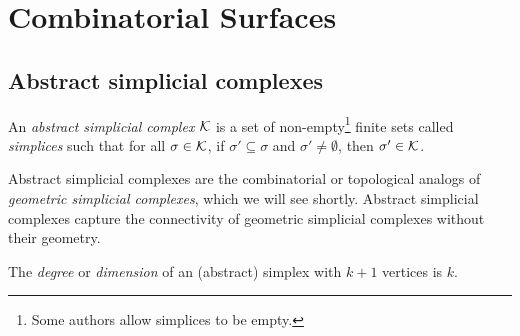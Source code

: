 \chapter{Combinatorial Surfaces}
\label{chap:combinatorial_surfaces}

\section{Abstract simplicial complexes}

\begin{definition}\label{def:abstract_simplicial_complex}
    \leanok
    An \emph{abstract simplicial complex} $\mathcal{K}$ is a set of non-empty\footnote{Some authors allow simplices to be empty.} finite sets called \emph{simplices} such that
    for all $\sigma \in \mathcal{K}$, 
    if $\sigma' \subseteq \sigma$ 
    and $\sigma' \neq \emptyset$,
    then $\sigma' \in \mathcal{K}$.
\begin{comment}
    An \emph{abstract simplicial complex} is a pair $(V,\K)$, 
    where $V$ is a set, 
    $\K \subseteq \Pow(V)$ is a set of finite %
    subsets of $V$, 
    and for all $\sigma \in \K$, 
    if $\sigma' \subseteq \sigma$ 
    then $\sigma' \in \K$. 
    $V$ is called the set of \emph{vertices} 
    and elements of $\K$ are called \emph{simplices}.
\end{comment}
\end{definition}

Abstract simplicial complexes are the combinatorial or topological analogs of \emph{geometric simplicial complexes}, which we will see shortly. Abstract simplicial complexes capture the connectivity of geometric simplicial complexes without their geometry.

\begin{comment}
\begin{definition}\label{def:abstract_simplex}
    \uses{def:abstract_simplicial_complex}
    \leanok
    \lean{abstract_simplicial_complex.abstract_simplex}
    Let $\K$ %
    be a finite simplicial complex. 
    For $k \in \N$, an \emph{abstract $k$-simplex} is 
    a simplex $\sigma \in \K$ consisting of exactly $k+1$ vertices.
\end{definition}
\end{comment}

\begin{definition}\label{def:degree}
    \leanok
    The \emph{degree} or \emph{dimension} of an (abstract) simplex with $k+1$ vertices is $k$. 
\end{definition}

